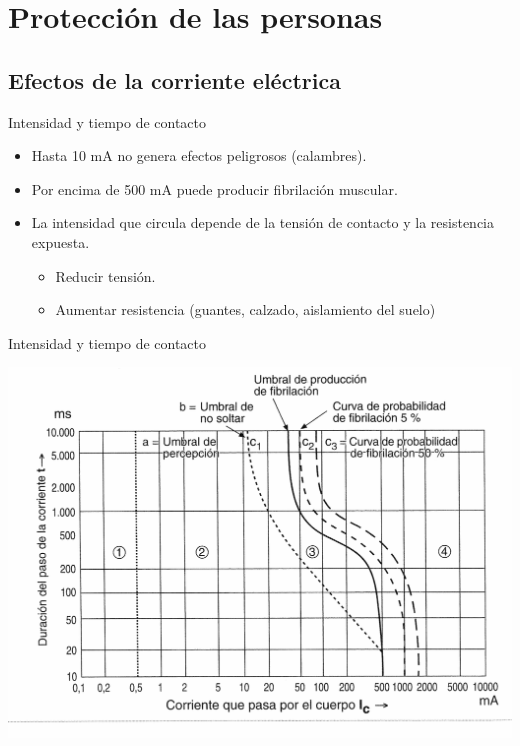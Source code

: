 \documentclass[xcolor={usenames,svgnames,dvipsnames}]{beamer}
\begin{document}
\section{Protección de las personas}
\label{sec:org8a21939}

\subsection{Efectos de la corriente eléctrica}
\label{sec:org50be650}

\begin{frame}[label={sec:org9e377b8}]{Intensidad y tiempo de contacto}
\begin{itemize}
\item Hasta 10 mA no genera efectos peligrosos (calambres).

\item Por encima de 500 mA puede producir fibrilación muscular.

\item La \alert{intensidad} que circula \alert{depende de la tensión de contacto y la
resistencia expuesta}.

\begin{itemize}
\item Reducir tensión.

\item Aumentar resistencia (guantes, calzado, aislamiento del suelo)
\end{itemize}
\end{itemize}
\end{frame}

\begin{frame}[label={sec:orgce38926}]{Intensidad y tiempo de contacto}
\begin{center}
\includegraphics[width=.9\linewidth]{../figs/CurvaIntensidadContactoTiempo.pdf}
\end{center}
\end{frame}
\end{document}
